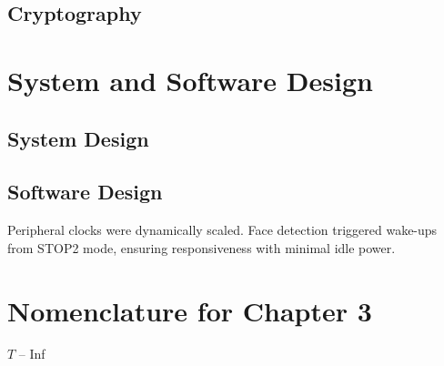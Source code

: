 \subsection{Cryptography}




\section{System and Software Design}
\subsection{System Design}
\subsection{Software Design}


Peripheral clocks were dynamically scaled. Face detection triggered wake-ups from STOP2 mode, ensuring responsiveness with minimal idle power.

\section*{Nomenclature for Chapter 3}
$T$ – Inf
